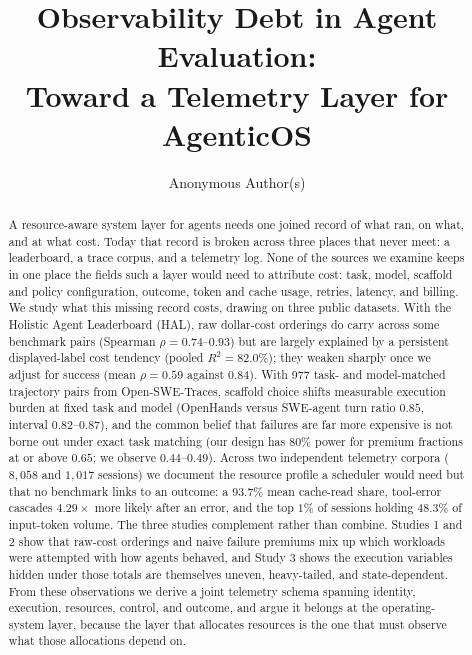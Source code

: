 \documentclass{article}
\title{Observability Debt in Agent Evaluation:\\
Toward a Telemetry Layer for AgenticOS}
\author{Anonymous Author(s)}
\begin{document}
\maketitle

\begin{abstract}
A resource-aware system layer for agents needs one joined record of what ran, on what, and at what cost. Today that record is broken across three places that never meet: a leaderboard, a trace corpus, and a telemetry log. None of the sources we examine keeps in one place the fields such a layer would need to attribute cost: task, model, scaffold and policy configuration, outcome, token and cache usage, retries, latency, and billing. We study what this missing record costs, drawing on three public datasets. With the Holistic Agent Leaderboard (HAL), raw dollar-cost orderings do carry across some benchmark pairs (Spearman $\rho{=}0.74$--$0.93$) but are largely explained by a persistent displayed-label cost tendency (pooled $R^2{=}82.0\%$); they weaken sharply once we adjust for success (mean $\rho{=}0.59$ against $0.84$). With 977 task- and model-matched trajectory pairs from Open-SWE-Traces, scaffold choice shifts measurable execution burden at fixed task and model (OpenHands versus SWE-agent turn ratio $0.85$, interval $0.82$--$0.87$), and the common belief that failures are far more expensive is not borne out under exact task matching (our design has $80\%$ power for premium fractions at or above $0.65$; we observe $0.44$--$0.49$). Across two independent telemetry corpora ($8{,}058$ and $1{,}017$ sessions) we document the resource profile a scheduler would need but that no benchmark links to an outcome: a $93.7\%$ mean cache-read share, tool-error cascades $4.29\times$ more likely after an error, and the top $1\%$ of sessions holding $48.3\%$ of input-token volume. The three studies complement rather than combine. Studies 1 and 2 show that raw-cost orderings and naive failure premiums mix up which workloads were attempted with how agents behaved, and Study 3 shows the execution variables hidden under those totals are themselves uneven, heavy-tailed, and state-dependent. From these observations we derive a joint telemetry schema spanning identity, execution, resources, control, and outcome, and argue it belongs at the operating-system layer, because the layer that allocates resources is the one that must observe what those allocations depend on.
\end{abstract}

\end{document}
